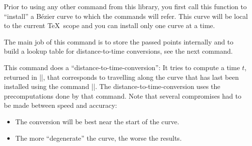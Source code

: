 \begin{command}{\pgfsetcurvilinearbeziercurve{}}
    Prior to using any other command from this library, you first call this
    function to ``install'' a Bézier curve to which the commands will refer.
    This curve will be local to the current \TeX\ scope and you can install
    only one curve at a time.

    The main job of this command is to store the passed points internally and
    to build a lookup table for distance-to-time conversions, see the next
    command.
\begin{codeexample}
\pgfsetcurvilinearbeziercurve
  {\pgfpointorigin}
  {\pgfpoint{1cm}{1cm}}
  {\pgfpoint{2cm}{1cm}}
  {\pgfpoint{3cm}{0cm}}
\end{codeexample}
\end{command}

\begin{command}{\pgfcurvilineardistancetotime{}}
    This command does a ``distance-to-time-conversion'': It tries to compute a
    time $t$, returned in |\pgf@x|, that corresponds to travelling
     along the curve that has last been installed using the
    command |\pgfsetcurvilinearbeziercurve|. The distance-to-time-conversion
    uses the precomputations done by that command. Note that several
    compromises had to be made between speed and accuracy:
    \begin{itemize}
        \item The conversion will be best near the start of the curve.
        \item The more ``degenerate'' the curve, the worse the results.
    \end{itemize}
\end{command}

